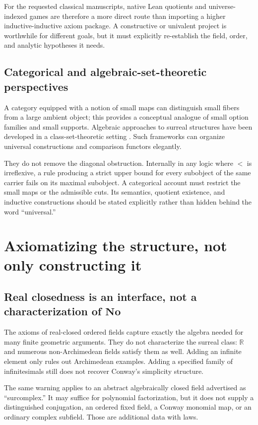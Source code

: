 \documentclass[11pt,letterpaper]{article}
\numberwithin{equation}{section}
\theoremstyle{definition}
\theoremstyle{remark}
\newcommand{\No}{\mathbf{No}}
\newcommand{\R}{\mathbb{R}}
\begin{document}
For the requested classical manuscripts, native Lean quotients and universe-indexed games are therefore a more direct route than importing a higher inductive-inductive axiom package. A constructive or univalent project is worthwhile for different goals, but it must explicitly re-establish the field, order, and analytic hypotheses it needs.

\subsection{Categorical and algebraic-set-theoretic perspectives}
A category equipped with a notion of small maps can distinguish small fibers from a large ambient object; this provides a conceptual analogue of small option families and small supports. Algebraic approaches to surreal structures have been developed in a class-set-theoretic setting \cite{RangelMariano}. Such frameworks can organize universal constructions and comparison functors elegantly.

They do not remove the diagonal obstruction. Internally in any logic where $<$ is irreflexive, a rule producing a strict upper bound for every subobject of the same carrier fails on its maximal subobject. A categorical account must restrict the small maps or the admissible cuts. Its semantics, quotient existence, and inductive constructions should be stated explicitly rather than hidden behind the word ``universal.''

\section{Axiomatizing the structure, not only constructing it}\label{sec:axioms}
\subsection{Real closedness is an interface, not a characterization of \texorpdfstring{$\No$}{No}}
The axioms of real-closed ordered fields capture exactly the algebra needed for many finite geometric arguments. They do not characterize the surreal class: $\R$ and numerous non-Archimedean fields satisfy them as well. Adding an infinite element only rules out Archimedean examples. Adding a specified family of infinitesimals still does not recover Conway's simplicity structure.

The same warning applies to an abstract algebraically closed field advertised as ``surcomplex.'' It may suffice for polynomial factorization, but it does not supply a distinguished conjugation, an ordered fixed field, a Conway monomial map, or an ordinary complex subfield. Those are additional data with laws.
\end{document}
